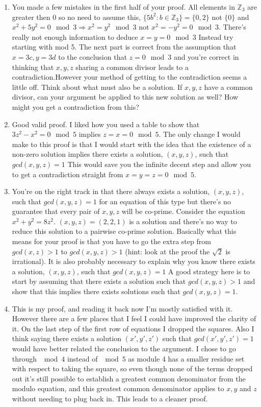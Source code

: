 \documentclass[11pt] {article}
\newcommand{\Z}{\mathbb{Z}}
\begin{document}
\begin{enumerate}
\item You made a few mistakes in the first half of your proof. All elements in $\Z_3$ are greater then $0$ so no need to assume this, $\{5b^2:b\in \Z_3\} = \{0,2\}$ not $\{0\}$ and $x^2 + 5y^2 = 0 \mod 3 \Rightarrow x^2 = y^2 \mod 3$ not $x^2 = - y^2 = 0  \mod 3 $. There's really not enough information to deduce $x=y=0 \mod 3$ Instead try starting with mod 5. The next part is correct from the assumption that $x = 3c, y=3d$ to the conclusion that $z = 0 \mod 3$ and you're correct in thinking that $x,y,z$ sharing a common divisor leads to a contradiction.However your method of getting to the contradiction seems a little off. Think about what must also be a solution. If $x,y,z$ have a common divisor, can your argument be applied to this new solution as well? How might you get a contradiction from this?
\item Good valid proof. I liked how you used a table to show that $3z^2 - x^2 = 0 \mod 5$ implies $z = x = 0 \mod 5$. The only change I would make to this proof is that I would start with the idea that the existence of a non-zero solution implies there exists a solution, $(x,y,z)$, such that $gcd(x,y,z) = 1$ This would save you the infinite decent step and allow you to get a contradiction straight from $x = y = z = 0 \mod 5$.
\item You're on the right track in that there always exists a solution, $(x,y,z)$, such that $gcd(x,y,z) = 1$ for an equation of this type but there's no guarantee that every pair of $x,y,z$ will be co-prime. Consider the equation $x^2 + y^2 = 8z^2$. $(x,y,z) = (2,2,1)$ is a solution and there's no way to reduce this solution to a pairwise co-prime solution. Basically what this means for your proof is that you have to go the extra step from $gcd(x,z) > 1$ to $gcd(x,y,z) > 1$ (hint: look at the proof the $\sqrt{2}$ is irrational). It is also probably necessary to explain why you know there exists a solution, $(x,y,z)$, such that $gcd(x,y,z) = 1$ A good strategy here is to start by assuming that there exists a solution such that $gcd(x,y,z) > 1$ and show that this implies there exists solutions such that $gcd(x,y,z) = 1$.
\item This is my proof, and reading it back now I'm mostly satisfied with it. However there are a few places that I feel I could have improved the clarity of it. On the last step of the first row of equations I dropped the squares. Also I think saying there exists a solution $(x',y',z')$ such that $gcd(x',y',z') = 1$ would have better related the conclusion to the argument. I chose to go through $\mod 4$ instead of $\mod 5$ as module 4 has a smaller residue set with respect to taking the square, so even though none of the terms dropped out it's still possible to establish a greatest common denominator from the modulo equation, and this greatest common denominator applies to $x,y$ and $z$ without needing to plug back in. This leads to a cleaner proof.

\end{enumerate}
\end{document}
